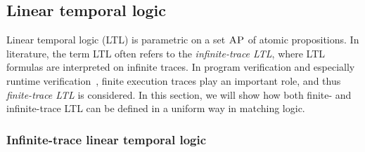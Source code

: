 \documentclass[letter,12pt]{article}
\newcommand{\AP}{\textsc{AP}}
\begin{document}
\subsection{Linear temporal logic}
\label{sec_LTL}


Linear temporal logic (LTL) is parametric 
on a set $\AP$ of atomic propositions.
In literature, the term LTL often refers to the \emph{infinite-trace LTL},
where LTL formulas are interpreted on infinite traces.
In program verification and especially runtime verification~\cite{bibid},
finite execution traces play an important role, and thus
\emph{finite-trace LTL} is considered.
In this section, we will show how
both finite- and infinite-trace LTL can be defined in a uniform way in matching logic.

\subsubsection{Infinite-trace linear temporal logic}
\end{document}
